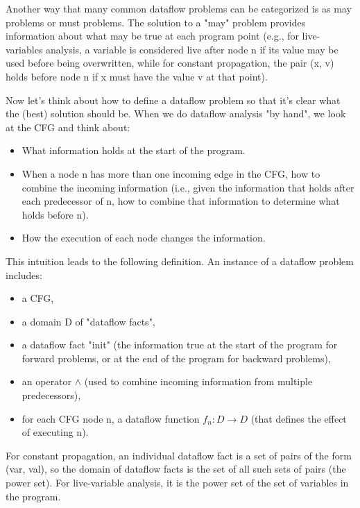 Another way that many common dataflow problems can be categorized is as
may problems or must problems. The solution to a "may" problem provides
information about what may be true at each program point
(e.g., for live-variables analysis, a variable is considered live after
node n if its value may be used before being overwritten,
while for constant propagation, the pair (x, v) holds before node n if x
must have the value v at that point).

Now let's think about how to define a dataflow problem so that it's
clear what the (best) solution should be. When we do dataflow analysis
"by hand", we look at the CFG and think about:

\begin{itemize}
	\item 	What information holds at the start of the program.
	\item 	When a node n has more than one incoming edge in the CFG, how to combine the incoming information (i.e., given the information that holds after each predecessor of n, how to combine that information to determine what holds before n).
	\item 	How the execution of each node changes the information.

\end{itemize}
This intuition leads to the following definition. An instance of a dataflow problem includes:


\begin{itemize}
	\item a CFG,
	\item a domain D of "dataflow facts",
	\item a dataflow fact "init" (the information true at the start of the program for forward problems, or at the end of the program for backward problems),
	\item an operator $\wedge$ (used to combine incoming information from multiple predecessors),
	\item for each CFG node n, a dataflow function $f_n : D \rightarrow D$ (that defines the effect of executing n).

\end{itemize}

For constant propagation, an individual dataflow fact is a set of pairs of the form (var, val), so the domain of dataflow facts is the set of all such sets of pairs (the power set). For live-variable analysis, it is the power set of the set of variables in the program.

